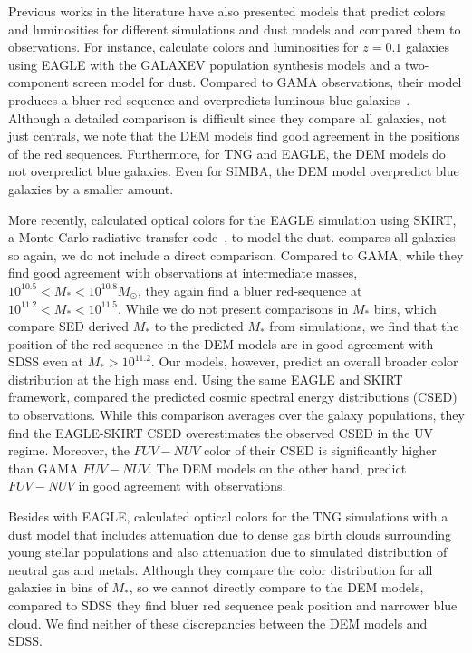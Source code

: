 Previous works in the literature have also presented models that predict colors
and luminosities for different simulations and dust models and compared them to
observations. For instance, \cite{trayford2015} calculate colors and luminosities 
for $z=0.1$ galaxies using EAGLE with the {\sc GALAXEV} population synthesis models 
and a two-component screen model for dust. Compared to GAMA observations, their
model produces a bluer red sequence and overpredicts luminous blue galaxies~\citep[][Figure
5]{trayford2015}. Although a detailed comparison is difficult since they
compare all galaxies, not just centrals, we note that the DEM models find good
agreement in the positions of the red sequences. Furthermore, for TNG and EAGLE, 
the DEM models do not overpredict blue galaxies. Even for SIMBA, the DEM model
overpredict blue galaxies by a smaller amount.

More recently, \cite{trayford2017} calculated optical colors for the EAGLE simulation using
{\sc SKIRT}, a Monte Carlo radiative transfer code~\citep{camps2015}, to model the dust. 
\cite{trayford2017} compares all galaxies so again, we do not include a direct 
comparison. Compared to GAMA, while they find good agreement with observations 
at intermediate masses, $10^{10.5} < M_* < 10^{10.8} M_\odot$, they again find
a bluer red-sequence at $10^{11.2} < M_* < 10^{11.5}$. While we do not present
comparisons in $M_*$ bins, which compare SED derived $M_*$ to the predicted
$M_*$ from simulations, we find that the position of the red sequence in the
DEM models are in good agreement with SDSS even at $M_* > 10^{11.2}$. Our models, 
however, predict an overall broader color distribution at the high mass end. 
Using the same \cite{trayford2017} EAGLE and {\sc SKIRT} framework,
\cite{baes2019} compared the predicted cosmic spectral energy distributions
(CSED) to observations. While this comparison averages over the galaxy
populations, they find the EAGLE-{\sc SKIRT} CSED overestimates the observed
CSED in the UV regime. Moreover, the $FUV-NUV$ color of their CSED is
significantly higher than GAMA $FUV-NUV$. The DEM models on the other hand, 
predict $FUV-NUV$ in good agreement with observations. 

Besides with EAGLE, \cite{nelson2018} calculated optical colors for the
TNG simulations with a dust model that includes attenuation due to dense gas 
birth clouds surrounding young stellar populations and also attenuation due to 
simulated distribution of neutral gas and metals.
Although they compare the color distribution for all galaxies in bins of $M_*$,
so we cannot directly compare to the DEM models, compared to SDSS they find 
bluer red sequence peak position and narrower blue cloud. We find neither of
these discrepancies between the DEM models and SDSS. 

